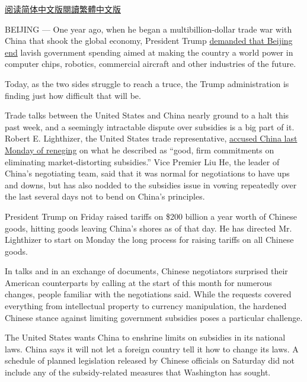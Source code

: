 \href{https://cn.nytimes.com/business/20190513/china-trump-trade-subsidies/}{阅读简体中文版}\href{https://cn.nytimes.com/business/20190513/china-trump-trade-subsidies/zh-hant/}{閱讀繁體中文版}

BEIJING --- One year ago, when he began a multibillion-dollar trade war
with China that shook the global economy, President Trump
\href{https://www.nytimes.com/2018/09/19/us/politics/trump-china-trade-war.html}{demanded
that Beijing end} lavish government spending aimed at making the country
a world power in computer chips, robotics, commercial aircraft and other
industries of the future.

Today, as the two sides struggle to reach a truce, the Trump
administration is finding just how difficult that will be.

Trade talks between the United States and China nearly ground to a halt
this past week, and a seemingly intractable dispute over subsidies is a
big part of it. Robert E. Lighthizer, the United States trade
representative,
\href{https://www.nytimes.com/2019/05/06/us/politics/trump-tariffs-china.html}{accused
China last Monday of reneging} on what he described as ``good, firm
commitments on eliminating market-distorting subsidies.'' Vice Premier
Liu He, the leader of China's negotiating team, said that it was normal
for negotiations to have ups and downs, but has also nodded to the
subsidies issue in vowing repeatedly over the last several days not to
bend on China's principles.

President Trump on Friday raised tariffs on \$200 billion a year worth
of Chinese goods, hitting goods leaving China's shores as of that day.
He has directed Mr. Lighthizer to start on Monday the long process for
raising tariffs on all Chinese goods.

In talks and in an exchange of documents, Chinese negotiators surprised
their American counterparts by calling at the start of this month for
numerous changes, people familiar with the negotiations said. While the
requests covered everything from intellectual property to currency
manipulation, the hardened Chinese stance against limiting government
subsidies poses a particular challenge.

The United States wants China to enshrine limits on subsidies in its
national laws. China says it will not let a foreign country tell it how
to change its laws. A schedule of planned legislation released by
Chinese officials on Saturday did not include any of the subsidy-related
measures that Washington has sought.

